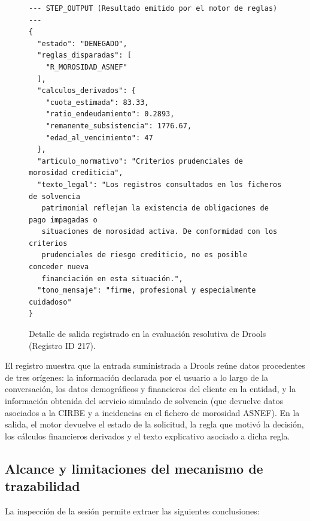 \documentclass[12pt,a4paper]{report}
\begin{document}
\begin{figure}[H]
\centering
\begin{minipage}{\textwidth}
\footnotesize
\begin{verbatim}
--- STEP_OUTPUT (Resultado emitido por el motor de reglas) ---
{
  "estado": "DENEGADO",
  "reglas_disparadas": [
    "R_MOROSIDAD_ASNEF"
  ],
  "calculos_derivados": {
    "cuota_estimada": 83.33,
    "ratio_endeudamiento": 0.2893,
    "remanente_subsistencia": 1776.67,
    "edad_al_vencimiento": 47
  },
  "articulo_normativo": "Criterios prudenciales de morosidad crediticia",
  "texto_legal": "Los registros consultados en los ficheros de solvencia
   patrimonial reflejan la existencia de obligaciones de pago impagadas o 
   situaciones de morosidad activa. De conformidad con los criterios 
   prudenciales de riesgo crediticio, no es posible conceder nueva 
   financiación en esta situación.",
  "tono_mensaje": "firme, profesional y especialmente cuidadoso"
}
\end{verbatim}
\end{minipage}
\caption{Detalle de salida registrado en la evaluación resolutiva de Drools (Registro ID 217).}
\end{figure}

El registro muestra que la entrada suministrada a Drools reúne datos procedentes de tres orígenes: la información declarada por el usuario a lo largo de la conversación, los datos demográficos y financieros del cliente en la entidad, y la información obtenida del servicio simulado de solvencia (que devuelve datos asociados a la CIRBE y a incidencias en el fichero de morosidad ASNEF). En la salida, el motor devuelve el estado de la solicitud, la regla que motivó la decisión, los cálculos financieros derivados y el texto explicativo asociado a dicha regla.

\subsection{Alcance y limitaciones del mecanismo de trazabilidad}

La inspección de la sesión permite extraer las siguientes conclusiones:
\end{document}
